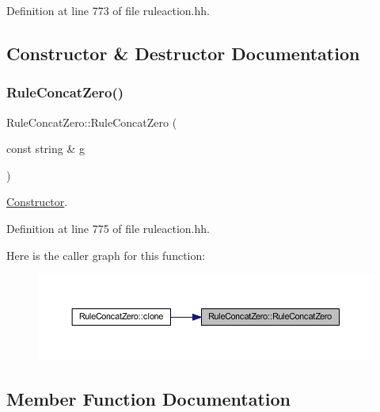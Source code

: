 Definition at line 773 of file ruleaction.\+hh.



\subsection{Constructor \& Destructor Documentation}
\mbox{\label{class_rule_concat_zero_afaf698b92ae526c59556c752f43b85da}} 
\subsubsection{\texorpdfstring{RuleConcatZero()}{RuleConcatZero()}}
{\footnotesize\ttfamily Rule\+Concat\+Zero\+::\+Rule\+Concat\+Zero (\begin{DoxyParamCaption}\item[{const string \&}]{g }\end{DoxyParamCaption})\hspace{0.3cm}{\ttfamily [inline]}}



\mbox{\hyperlink{class_constructor}{Constructor}}. 



Definition at line 775 of file ruleaction.\+hh.

Here is the caller graph for this function\+:
\nopagebreak
\begin{figure}[H]
\begin{center}
\leavevmode
\includegraphics[width=350pt]{class_rule_concat_zero_afaf698b92ae526c59556c752f43b85da_icgraph}
\end{center}
\end{figure}


\subsection{Member Function Documentation}
\mbox{\label{class_rule_concat_zero_a0cfa16444e6d4609972b78e5ce83c7e8}} 
